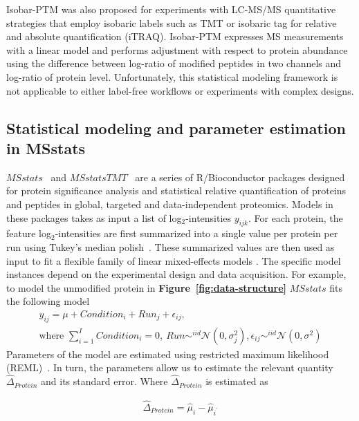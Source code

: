 \documentclass[mcp]{article}
\numberwithin{table}{section}
\def\figref#1{{\bf Figure~\ref{fig:#1}}}
\begin{document}
\medskip {} \medskip \noindent Isobar-PTM was also proposed for experiments with LC-MS/MS quantitative strategies that employ isobaric labels such as TMT or isobaric tag for relative and absolute quantification (iTRAQ)\cite{Breitwieser:2013}. Isobar-PTM expresses MS measurements with a linear model and performs adjustment with respect to protein abundance using the difference between log-ratio of modified peptides in two channels and log-ratio of protein level. Unfortunately, this statistical modeling framework is not applicable to either label-free workflows or experiments with complex designs. 


\subsection*{Statistical modeling and parameter estimation in MSstats}

$MSstats$~\cite{Choi:2014} and $MSstatsTMT$~\cite{Huang:2020} are a series of R/Bioconductor packages designed for protein significance analysis and statistical relative quantification of proteins and peptides in global, targeted and data-independent proteomics. Models in these packages takes as input a list of log$_2$-intensities $y_{ijk}$. For each protein, the feature log$_2$-intensities are first summarized into a single value per protein per run using Tukey's median polish~\cite{Tukey:1977}. These summarized values are then used as input to fit a flexible family of linear mixed-effects models \cite{McLean:1991, Faraway:2006, Bolker2009}. The specific model instances depend on the experimental design and data acquisition. For example, to model the unmodified protein in \figref{data-structure} $MSstats$ fits the following model
\begin{eqnarray}
& y_{ij} = \mu + Condition_i + Run_{j} + \epsilon_{ij}, & \\ 
& \text{where } \sum\limits_{i=1}^{I} Condition_i = 0,\ Run \mathop\sim^{iid} \mathcal{N}(0, \sigma^2_j), \epsilon_{ij} \mathop\sim^{iid} \mathcal{N}(0, \sigma^2) & \nonumber
\label{eq:msstats_model}
\end{eqnarray}
Parameters of the model are estimated using restricted maximum likelihood (REML)~\cite{Kenward}.
In turn, the parameters allow us to estimate the relevant quantity $\hat{\Delta}_{Protein}$ and its standard error. Where $\hat{\Delta}_{Protein}$ is estimated as

\begin{eqnarray}
\hat{\Delta}_{Protein} = \hat{\mu}_{i} - \hat{\mu}_{i^{\prime}}
\label{eq:protein_delta}
\end{eqnarray}
\end{document}

